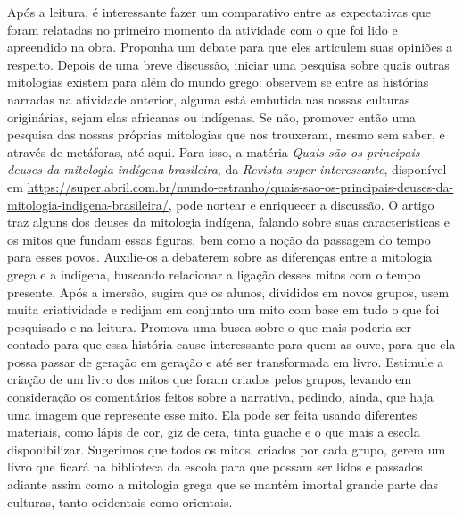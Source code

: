 \documentclass[11pt]{extarticle}
\begin{document}
Após a leitura, é interessante fazer um comparativo entre as expectativas que foram relatadas no primeiro momento da atividade com o que foi lido e apreendido na obra. Proponha um debate para que eles articulem suas opiniões a respeito. Depois de uma breve discussão, iniciar uma pesquisa sobre quais outras mitologias existem para além do mundo grego: observem se entre as histórias narradas na atividade anterior, alguma está embutida nas nossas culturas originárias, sejam elas africanas ou indígenas. Se não, promover então uma pesquisa das nossas próprias mitologias que nos trouxeram, mesmo sem saber, e através de metáforas, até aqui. Para isso, a matéria \textit{Quais são os principais deuses da mitologia indígena brasileira}, da \textit{Revista super interessante}, disponível em \url{https://super.abril.com.br/mundo-estranho/quais-sao-os-principais-deuses-da-mitologia-indigena-brasileira/}, pode nortear e enriquecer a discussão. O artigo traz alguns dos deuses da mitologia indígena, falando sobre suas características e os mitos que fundam essas figuras, bem como a noção da passagem do tempo para esses povos. Auxilie-os a debaterem sobre as diferenças entre a mitologia grega e a indígena, buscando relacionar a ligação desses mitos com o tempo presente. Após a imersão, sugira que os alunos, divididos em novos grupos, usem muita criatividade e redijam em conjunto um mito com base em tudo o que foi pesquisado e na leitura. Promova uma busca sobre o que mais poderia ser contado para que essa história cause interessante para quem as ouve, para que ela possa passar de geração em geração e até ser transformada em livro. Estimule a criação de um livro dos mitos que foram criados pelos grupos, levando em consideração os comentários feitos sobre a narrativa, pedindo, ainda, que haja uma imagem que represente esse mito. Ela pode ser feita usando diferentes materiais, como lápis de cor, giz de cera, tinta guache e o que mais a escola disponibilizar. Sugerimos que todos os mitos, criados por cada grupo, gerem um livro que ficará na biblioteca da escola para que possam ser lidos e passados adiante assim como a mitologia grega que se mantém imortal grande parte das culturas, tanto ocidentais como orientais.


\end{document}
